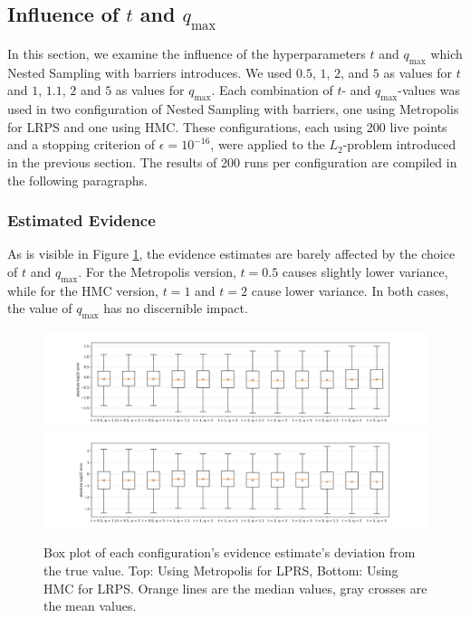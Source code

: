 \documentclass[12pt, a4paper]{report}
\begin{document}
\FloatBarrier
\subsection{Influence of $t$ and $q_{\textrm{max}}$}
In this section, we examine the influence of the hyperparameters $t$ and $q_{\textrm{max}}$ which Nested Sampling with barriers introduces.
We used $0.5$, $1$, $2$, and $5$ as values for $t$ and $1$, $1.1$, $2$ and $5$ as values for $q_{\textrm{max}}$.
Each combination of $t$- and $q_{\textrm{max}}$-values was used in two configuration of Nested Sampling with barriers, one using Metropolis for LRPS and one using HMC.
These configurations, each using 200 live points and a stopping criterion of $\epsilon=10^{-16}$, were applied to the $L_2$-problem introduced in the previous section.
The results of 200 runs per configuration are compiled in the following paragraphs.

\subsubsection{Estimated Evidence}
As is visible in Figure \ref{fig:results_params_logZ}, the evidence estimates are barely affected by the choice of $t$ and $q_{\textrm{max}}$.
For the Metropolis version, $t=0.5$ causes slightly lower variance, while for the HMC version, $t=1$ and $t=2$ cause lower variance.
In both cases, the value of $q_{\textrm{max}}$ has no discernible impact.
\begin{figure}
    \centering
    \includegraphics[trim={3cm 0cm 3cm 0cm}, clip, width=\textwidth]{figs/results/params/logZ_diffs_metropolis.png}
    \includegraphics[trim={3cm 0cm 3cm 0cm}, clip, width=\textwidth]{figs/results/params/logZ_diffs_hmc.png}
    \caption{Box plot of each configuration's evidence estimate's deviation from the true value. Top: Using Metropolis for LPRS, Bottom: Using HMC for LRPS. Orange lines are the median values, gray crosses are the mean values.}
    \label{fig:results_params_logZ}
\end{figure}
\end{document}
